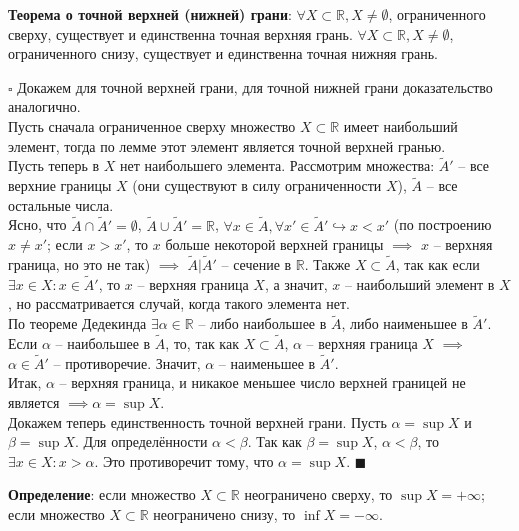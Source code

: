 \documentclass[12pt, a4paper, reqno]{article}
\begin{document}
    \textbf{Теорема о точной верхней (нижней) грани}: $\forall X \subset \mathbb{R}, X \neq \emptyset$,
    ограниченного сверху, существует и единственна точная верхняя грань. $\forall X \subset
    \mathbb{R}, X \neq \emptyset$, ограниченного снизу, существует и единственна точная нижняя грань.

    $\square$ Докажем для точной верхней грани, для точной нижней грани доказательство аналогично.\\
    Пусть сначала ограниченное сверху множество $X \subset \mathbb{R}$ имеет наибольший элемент,
    тогда по лемме этот элемент является точной верхней гранью.\\
    Пусть теперь в $X$ нет наибольшего элемента. Рассмотрим множества: $\tilde{A}'$ -- все верхние
    границы $X$ (они существуют в силу ограниченности $X$), $\tilde{A}$ -- все остальные числа.\\
    Ясно, что $\tilde{A} \cap \tilde{A}' = \emptyset$, $\tilde{A} \cup\tilde{A}' = \mathbb{R}$,
    $\forall x \in\tilde{A}, \forall x' \in\tilde{A}' \hookrightarrow x < x'$ (по построению
    $x \neq x'$; если $x > x'$, то $x$ больше некоторой верхней границы $\implies$ $x$ -- верхняя
    граница, но это не так) $\implies$ $\tilde{A}|\tilde{A}'$ -- сечение в $\mathbb{R}$. Также
    $X \subset \tilde{A}$, так как если $\exists x\in X: x\in \tilde{A}'$, то $x$ -- верхняя граница
    $X$, а значит, $x$ -- наибольший элемент в $X$, но рассматривается случай, когда такого элемента
    нет.\\
    По теореме Дедекинда $\exists\alpha\in\mathbb{R}$ -- либо наибольшее в $\tilde{A}$, либо
    наименьшее в $\tilde{A}'$. Если $\alpha$ -- наибольшее в $\tilde{A}$, то, так как
    $X \subset \tilde{A}$, $\alpha$ -- верхняя граница $X$ $\implies$ $\alpha\in\tilde{A}'$ --
    противоречие. Значит, $\alpha$ -- наименьшее в $\tilde{A}'$.\\
    Итак, $\alpha$ -- верхняя граница, и никакое меньшее число верхней границей не является
    $\implies \alpha = \sup X$.\\
    Докажем теперь единственность точной верхней грани. Пусть $\alpha = \sup X$ и $\beta = \sup X$.
    Для определённости $\alpha < \beta$. Так как $\beta = \sup X$, $\alpha < \beta$, то $\exists x
    \in X: x > \alpha$. Это противоречит тому, что $\alpha = \sup X$. $\blacksquare$

    \textbf{Определение}: если множество $X \subset\mathbb{R}$ неограничено сверху, то
    $\sup X = +\infty$; если множество $X \subset\mathbb{R}$ неограничено снизу, то $\inf X = -\infty$.
\end{document}
